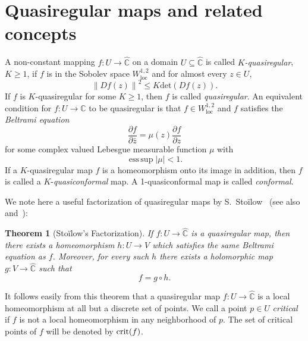 \documentclass[12pt]{amsart}
\makeatletter
\newtheorem{thm}{Theorem}[section]
\newtheorem{cor}[thm]{Corollary}
\newtheorem*{pf}{Proof}
\newcommand{\C}{\mathbb{C}}
\newcommand{\hC}{\widehat{\C}}
\newcommand{\sub}{\subseteq }
\newcommand{\co}{\colon}
\renewenvironment{pf}[1][\proofname]{%
  \par
  \pushQED{\qed}%
  \normalfont\topsep6\p@ \@plus6\p@ \trivlist
  \item[\hskip\labelsep\itshape
        \bfseries #1\@addpunct{:}]%
  \ignorespaces
}{%
  \popQED\endtrivlist
}
\DeclareMathOperator*{\esssup}{ess\,sup}
\makeatother
\begin{document}
\section{Quasiregular maps and related concepts}\label{sec:qr}
\noindent A non-constant mapping $f\co U\to \hC$ on a domain $U\sub \hC$ is called \textit{$K$-quasiregular}, $K\geq 1$, if $f$ is in the Sobolev space $W_\mathrm{loc}^{1,2}$ and for almost every $z\in U$,
$$
  \left\lVert Df(z)\right\rVert^2\leq K\mathrm{det}(Df(z)).
$$
If $f$ is $K$-quasiregular for some $K\geq 1$, then $f$ is called \textit{quasiregular}. An equivalent condition for $f\co U\to \C$ to be quasiregular is that $f\in W_\mathrm{loc}^{1,2}$ and $f$ satisfies the \textit{Beltrami equation}
$$
\frac{\partial f}{\partial \bar{z}}=\mu(z)\frac{\partial f}{\partial z}
$$
for some complex valued Lebesgue measurable function $\mu$ with 
$$
\esssup|\mu|<1.
$$
If a $K$-quasiregular map $f$ is a homeomorphism onto its image in addition, then $f$ is called a $K$-\textit{quasiconformal} map. A 1-quasiconformal map is called \emph{conformal}.


We note here a useful factorization of quasiregular maps by S.~Sto\-\"i\-low~\cite{St} (see also~\cite[Section~5.5]{AIM} and~\cite{LP2}):
\begin{thm}[Sto\"ilow's Factorization]
  If $f\co U\to \hC$ is a quasiregular map, then there exists a homeomorphism $h\co U\to V$ which satisfies the same Beltrami
  equation as $f$. Moreover, for every such $h$ there exists a holomorphic map $g\co V\to \hC$ such that 
  $$f=g\circ h.$$
\end{thm} 
\noindent It follows easily from this theorem that a quasiregular map $f\co U\to \hC$ is a local homeomorphism at all but a discrete set of points.
We call a point $p\in U$ \textit{critical} if $f$ is not a local homeomorphism in any neighborhood of $p$.  The set of critical points of $f$ will be denoted by ${\rm crit }(f)$.
\end{document}
